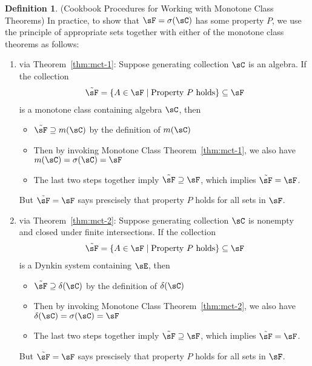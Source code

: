 \documentclass[12pt]{article}
\theoremstyle{plain}
\theoremstyle{definition}
\newtheorem{defn}[thm]{Definition}
\theoremstyle{remark}
\begin{document}
\begin{defn}
(Cookbook Procedures for Working with Monotone Class Theorems)
In practice, to show that $\sF=\sigma(\sC)$ has some property $P$, we
use the principle of appropriate sets together with either of the
monotone class theorems as follows:
\begin{enumerate}[label=(\roman*)]
  \item
    via Theorem~\ref{thm:mct-1}:
    Suppose generating collection $\sC$ is an algebra.
    If the collection
    \begin{align*}
      \tilde{\sF} = \{A\in\sF \;|\; \text{Property $P$ holds}\}
      \subseteq \sF
    \end{align*}
    is a monotone class containing algebra $\sC$,
    then
    \begin{itemize}
      \item $\tilde{\sF}\supseteq m(\sC)$ by the definition of $m(\sC)$
      \item Then by invoking Monotone Class Theorem~\ref{thm:mct-1},
        we also have $m(\sC)=\sigma(\sC)=\sF$
      \item The last two steps together imply $\tilde{\sF}\supseteq\sF$,
        which implies $\tilde{\sF}=\sF$.
    \end{itemize}
    But $\tilde{\sF}=\sF$ says prescisely that property $P$ holds for
    all sets in $\sF$.

  \item
    via Theorem~\ref{thm:mct-2}:
    Suppose generating collection $\sC$ is nonempty and closed under
    finite intersections.
    If the collection
    \begin{align*}
      \tilde{\sF} = \{A\in\sF \;|\; \text{Property $P$ holds}\}
      \subseteq \sF
    \end{align*}
    is a Dynkin system containing $\sE$, then
    \begin{itemize}
      \item $\tilde{\sF}\supseteq \delta(\sC)$ by the definition of
        $\delta(\sC)$
      \item Then by invoking Monotone Class Theorem~\ref{thm:mct-2},
        we also have $\delta(\sC)=\sigma(\sC)=\sF$
      \item The last two steps together imply $\tilde{\sF}\supseteq\sF$,
        which implies $\tilde{\sF}=\sF$.
    \end{itemize}
    But $\tilde{\sF}=\sF$ says prescisely that property $P$ holds for
    all sets in $\sF$.
\end{enumerate}
\end{defn}
\end{document}
